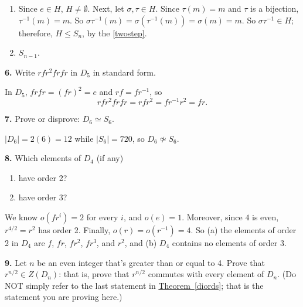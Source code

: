 \documentclass[10pt,]{book}
\theoremstyle{plain}
\theoremstyle{definition}
\theoremstyle{definition}
\theoremstyle{definition}
\theoremstyle{definition}
\numberwithin{equation}{section}
\begin{document}
\par\smallskip
\leavevmode%
\begin{enumerate}[label=(\alph*)]
\item\hypertarget{li-378}{}
          Since \(e\in H\), \(H\neq \emptyset\).  Next, let \(\sigma, \tau\in H\).  Since \(\tau(m)=m\) and \(\tau\) is a bijection, \(\tau^{-1}(m)=m\).  So \(\sigma \tau^{-1}(m)=\sigma(\tau^{-1}(m))=\sigma(m)=m\).  So \(\sigma \tau^{-1}\in H\); therefore, \(H\leq S_n\), by the \hyperref[twostep]{\ref{twostep}}.
\item\hypertarget{li-379}{}
          \(S_{n-1}\).
\end{enumerate}
\par\smallskip
\noindent\textbf{6.}\quad{}
        Write \(rfr^2frfr\) in \(D_5\) in standard form.
\par\smallskip

      In \(D_5\), \(frfr=(fr)^2=e\) and \(rf=fr^{-1}\), so
\begin{equation*}

        rfr^2frfr=rfr^2=fr^{-1}r^2=fr.
      
\end{equation*}

\par\smallskip
\noindent\textbf{7.}\quad{}
        Prove or disprove: \(D_6\simeq S_6\).
\par\smallskip

      \(|D_6|=2(6)=12\) while \(|S_6|=720\), so \(D_6\not\simeq S_6\).
\par\smallskip
\noindent\textbf{8.}\quad{} Which elements of \(D_4\) (if any)
        \leavevmode%
\begin{enumerate}[label=(\alph*)]
\item\hypertarget{li-380}{}
              have order 2?
\item\hypertarget{li-381}{}
              have order \(3\)?
\end{enumerate}

\par\smallskip

      We know \(o(fr^i)=2\) for every \(i\), and \(o(e)=1\). Moreover, since \(4\) is even, \(r^{4/2}=r^2\) has order 2. Finally, \(o(r)=o(r^{-1})=4\). So (a) the elements of order 2 in \(D_4\) are \(f\), \(fr\), \(fr^2\), \(fr^3\), and \(r^2\), and (b) \(D_4\) contains no elements of order 3.
\par\smallskip
\noindent\textbf{9.}\quad{}
        Let \(n\) be an even integer that's greater than or equal to 4. Prove that \(r^{n/2}\in Z(D_n)\): that is, prove that \(r^{n/2}\) commutes with every element of \(D_n\). (Do NOT simply refer to the last statement in \hyperref[diords]{Theorem~\ref{diords}}; that is the statement you are proving here.)
\par\smallskip
\end{document}

